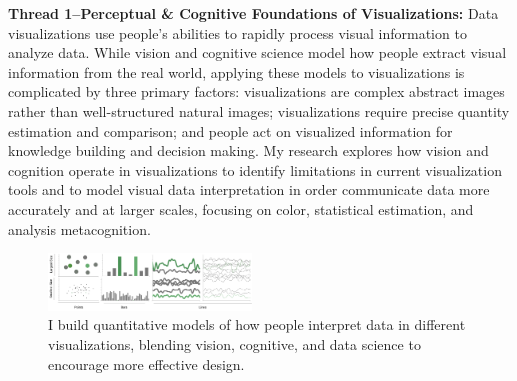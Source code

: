 \documentclass[11pt]{article}
\begin{document}
\textbf{Thread 1--Perceptual \& Cognitive Foundations of Visualizations: }
Data visualizations use people's abilities to rapidly process visual information to analyze data. While vision and cognitive science model how people extract visual information from the real world, applying these models to visualizations is complicated by three primary factors: visualizations are complex abstract images rather than well-structured natural images; visualizations require precise quantity estimation and comparison; and people act on visualized information for knowledge building and decision making. My research explores how vision and cognition operate in visualizations to identify limitations in current visualization tools and to model visual data interpretation in order communicate data more accurately and at larger scales, focusing on color, statistical estimation, and analysis metacognition. 

\begin{figure}
	\begin{center}
		\includegraphics[width=0.48\textwidth]{teaserOne.pdf}
	\end{center}
	\caption{I build quantitative models of how people interpret data in different visualizations, blending vision, cognitive, and data science to encourage more effective design.}\label{color}
\end{figure}
\end{document}
